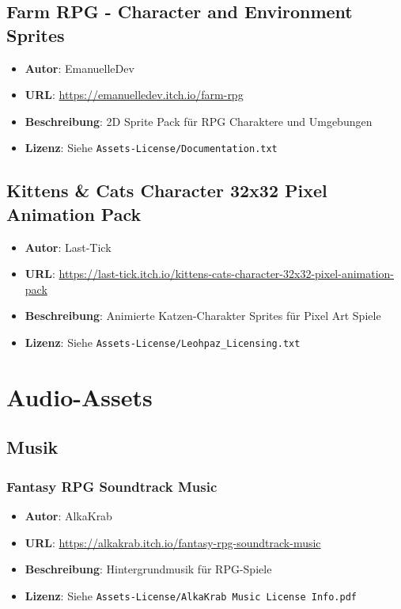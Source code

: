 \documentclass[
  a4paper,
  11pt,
  ngerman,
  parskip=half,
  bibliography=totoc,
  listof=totoc
]{scrreprt}
\begin{document}
\subsection{Farm RPG - Character and Environment Sprites}
\begin{itemize}
    \item \textbf{Autor}: EmanuelleDev
    \item \textbf{URL}: \url{https://emanuelledev.itch.io/farm-rpg}
    \item \textbf{Beschreibung}: 2D Sprite Pack für RPG Charaktere und Umgebungen
    \item \textbf{Lizenz}: Siehe \texttt{Assets-License/Documentation.txt}
\end{itemize}

\subsection{Kittens \& Cats Character 32x32 Pixel Animation Pack}
\begin{itemize}
    \item \textbf{Autor}: Last-Tick
    \item \textbf{URL}: \url{https://last-tick.itch.io/kittens-cats-character-32x32-pixel-animation-pack}
    \item \textbf{Beschreibung}: Animierte Katzen-Charakter Sprites für Pixel Art Spiele
    \item \textbf{Lizenz}: Siehe \texttt{Assets-License/Leohpaz\_Licensing.txt}
\end{itemize}

\section{Audio-Assets}

\subsection{Musik}

\subsubsection{Fantasy RPG Soundtrack Music}
\begin{itemize}
    \item \textbf{Autor}: AlkaKrab
    \item \textbf{URL}: \url{https://alkakrab.itch.io/fantasy-rpg-soundtrack-music}
    \item \textbf{Beschreibung}: Hintergrundmusik für RPG-Spiele
    \item \textbf{Lizenz}: Siehe \texttt{Assets-License/AlkaKrab Music License Info.pdf}
\end{itemize}
\end{document}
